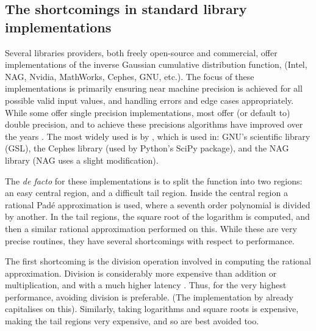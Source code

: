 \documentclass[manuscript,review]{acmart}
\begin{document}
\subsection{The shortcomings in standard library implementations}

Several libraries providers, both freely open-source and commercial, offer implementations of the inverse Gaussian cumulative distribution function, (Intel, NAG, Nvidia, MathWorks, Cephes, GNU, etc.). The focus of these implementations is primarily ensuring near machine precision is achieved for all possible valid input values, and handling errors and edge cases appropriately. While some offer single precision implementations, most offer (or default to) double precision, and to achieve these precisions algorithms have improved over the years \citep{hastings1955approximations,evans1974algorithm70,beasley1985percentage,wichura1988algorithm,marsaglia1994rapid,giles2011approximating}. The most widely used is by \citet{wichura1988algorithm}, which is used in: GNU's scientific library (GSL), the Cephes library (used by Python's SciPy package), and the NAG library (NAG uses a slight modification). 

The \textit{de facto} for these implementations is to split the function into two regions: an easy central region, and a difficult tail region. Inside the central region a rational Pad\'{e} approximation is used, where a seventh order polynomial is divided by another. In the tail regions, the square root of the logarithm is computed, and then a similar rational approximation performed on this. While these are very precise routines, they have several shortcomings with respect to performance.

The first shortcoming is the division operation involved in computing the rational approximation. Division is considerably more expensive than addition or multiplication, and with a much higher latency \citep{wittmann2015short,fog2018instruction}. Thus, for the very highest performance, avoiding division is preferable. (The implementation by \citet{giles2011approximating} already capitalises on this). Similarly, taking logarithms and square roots is expensive, making the tail regions very expensive, and so are best avoided too. 
\end{document}
